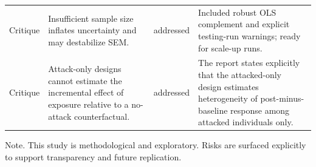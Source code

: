 \begin{table}[htbp]
\begin{threeparttable}
\begin{tabular}{llll}
Critique & Insufficient sample size inflates uncertainty and may destabilize SEM. & addressed & Included robust OLS complement and explicit testing-run warnings; ready for scale-up runs. \\
Critique & Attack-only designs cannot estimate the incremental effect of exposure relative to a no-attack counterfactual. & addressed & The report states explicitly that the attacked-only design estimates heterogeneity of post-minus-baseline response among attacked individuals only. \\
\bottomrule
\end{tabular}
\begin{tablenotes}[flushleft]
\footnotesize
\item Note. This study is methodological and exploratory. Risks are surfaced explicitly to support transparency and future replication.
\end{tablenotes}
\end{threeparttable}
\end{table}